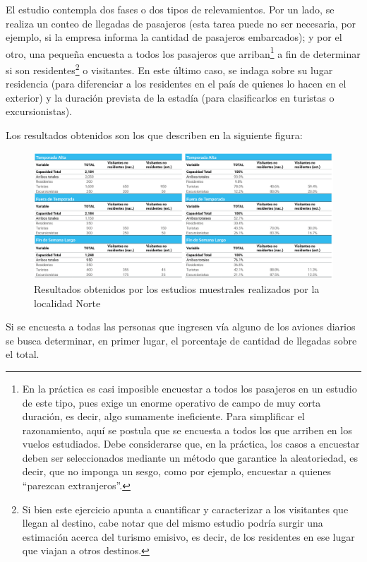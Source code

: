 \documentclass[
]{book}
\begin{document}
El estudio contempla dos fases o dos tipos de relevamientos. Por un lado, se realiza un conteo de llegadas de pasajeros (esta tarea puede no ser necesaria, por ejemplo, si la empresa informa la cantidad de pasajeros embarcados); y por el otro, una pequeña encuesta a todos los pasajeros que arriban\footnote{En la práctica es casi imposible encuestar a todos los pasajeros en un estudio de este tipo, pues exige un enorme operativo de campo de muy corta duración, es decir, algo sumamente ineficiente. Para simplificar el razonamiento, aquí se postula que se encuesta a todos los que arriben en los vuelos estudiados. Debe considerarse que, en la práctica, los casos a encuestar deben ser seleccionados mediante un método que garantice la aleatoriedad, es decir, que no imponga un sesgo, como por ejemplo, encuestar a quienes ``parezcan extranjeros''.} a fin de determinar si son residentes\footnote{Si bien este ejercicio apunta a cuantificar y caracterizar a los visitantes que llegan al destino, cabe notar que del mismo estudio podría surgir una estimación acerca del turismo emisivo, es decir, de los residentes en ese lugar que viajan a otros destinos.} o visitantes. En este último caso, se indaga sobre su lugar residencia (para diferenciar a los residentes en el país de quienes lo hacen en el exterior) y la duración prevista de la estadía (para clasificarlos en turistas o excursionistas).

Los resultados obtenidos son los que describen en la siguiente figura:

\begin{figure}

{\centering \includegraphics[width=1\linewidth]{imagenes/figura06} 

}

\caption{Resultados obtenidos por los estudios muestrales realizados por la localidad Norte}\label{fig:resultadosobtenidos}
\end{figure}

Si se encuesta a todas las personas que ingresen vía alguno de los aviones diarios se busca determinar, en primer lugar, el porcentaje de cantidad de llegadas sobre el total.
\end{document}
